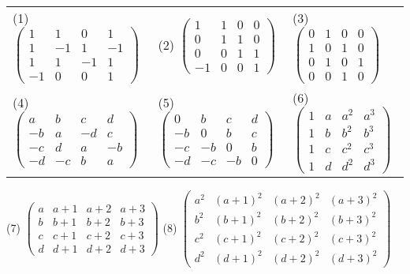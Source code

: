 \documentclass[a4paper,fontset=windows]{ctexbook}
\theoremstyle{definition}
\begin{document}
\begin{enumerate}
\hspace*{-6pt}\begin{tabular}{l@{\qquad\qquad}l@{\qquad\qquad}l}
(1) $\begin{pmatrix}1&1&0&1 \\ 1&-1&1&-1 \\ 1&1&-1&1 \\ -1&0&0&1\end{pmatrix}$ &
(2) $\begin{pmatrix}1&1&0&0 \\ 0&1&1&0 \\ 0&0&1&1 \\ -1&0&0&1\end{pmatrix}$ &
(3) $\begin{pmatrix}0&1&0&0 \\ 1&0&1&0 \\ 0&1&0&1 \\ 0&0&1&0\end{pmatrix}$ \\
(4) $\begin{pmatrix}a&b&c&d \\ -b&a&-d&c \\ -c&d&a&-b \\ -d&-c&b&a\end{pmatrix}$ &
(5) $\begin{pmatrix}0&b&c&d \\ -b&0&b&c \\ -c&-b&0&b \\ -d&-c&-b&0\end{pmatrix}$ &
(6) $\begin{pmatrix}1&a&a^2&a^3 \\ 1&b&b^2&b^3 \\ 1&c&c^2&c^3 \\ 1&d&d^2&d^3\end{pmatrix}$
\end{tabular}

(7) $\begin{pmatrix}a&a+1&a+2&a+3 \\ b&b+1&b+2&b+3 \\ c&c+1&c+2&c+3 \\ d&d+1&d+2&d+3\end{pmatrix}$ \hspace{12pt}
(8) $\begin{pmatrix}a^2&(a+1)^2&(a+2)^2&(a+3)^2 \\ b^2&(b+1)^2&(b+2)^2&(b+3)^2 \\ c^2&(c+1)^2&(c+2)^2&(c+3)^2 \\ d^2&(d+1)^2&(d+2)^2&(d+3)^2\end{pmatrix}$


\end{enumerate}
\end{document}
